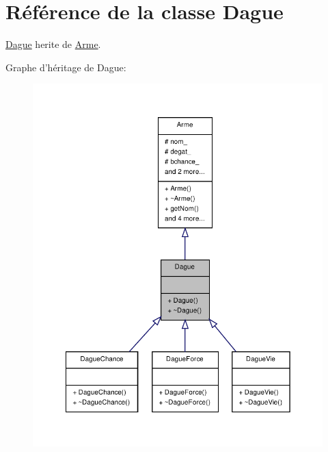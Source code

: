 \hypertarget{class_dague}{\section{Référence de la classe Dague}
\label{class_dague}
}


\hyperlink{class_dague}{Dague} herite de \hyperlink{class_arme}{Arme}.  




Graphe d'héritage de Dague\-:
\nopagebreak
\begin{figure}[H]
\begin{center}
\leavevmode
\includegraphics[width=348pt]{class_dague__inherit__graph}
\end{center}
\end{figure}


